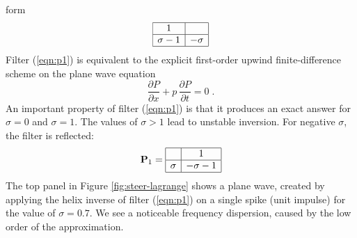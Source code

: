form
\begin{equation}
  \label{eqn:p1}
  \begin{array}{|c|c|}
    \hline
    1 & \\ \hline
    \sigma-1 & -\sigma \\ \hline
  \end{array}
\end{equation}
Filter (\ref{eqn:p1}) is equivalent to the explicit first-order upwind
finite-difference scheme on the plane wave equation
\begin{equation}
  \label{eqn:wave}
  \frac{\partial P}{\partial x} + p\,\frac{\partial P}{\partial t} = 0\;.
\end{equation}
An important property of filter (\ref{eqn:p1}) is that it produces an
exact answer for $\sigma=0$ and $\sigma=1$. The values of $\sigma > 1$
lead to unstable inversion. For negative $\sigma$, the filter is 
reflected:
\begin{equation}
  \label{eqn:p1p}
  \bold{P}_1 =
  \begin{array}{|c|c|}
    \hline
     & 1 \\ \hline
    \sigma & -\sigma - 1 \\ \hline
  \end{array}
\end{equation}
The top panel in Figure \ref{fig:steer-lagrange} shows a plane wave, created
by applying the helix inverse of filter (\ref{eqn:p1}) on a single
spike (unit impulse) for the value of $\sigma=0.7$. We see a
noticeable frequency dispersion, caused by the low order of the
approximation.

